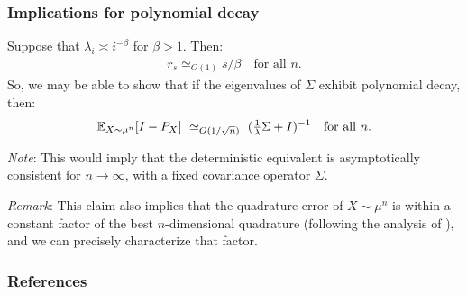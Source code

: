 \documentclass[10pt]{beamer}
\begin{document}
\begin{frame}
  \frametitle{Implications for polynomial decay}
  Suppose that $\lambda_i\asymp i^{-\beta}$ for $\beta>1$. Then:
  \begin{align*}
    r_s \simeq_{O(1)}  s/\beta\quad\text{for all $n$.}
  \end{align*}
  So, we may be able to show that if the eigenvalues of $\Sigma$
  exhibit polynomial decay, then:
  \begin{align*}
    \mathbb E_{X\sim\mu^n}[I-P_X]\ \simeq_{O(1/\sqrt{n})}\
    (\tfrac1\lambda\Sigma+ I)^{-1}\quad\text{for all $n$.}
    \end{align*}

\emph{Note}: This would imply that the deterministic equivalent is
asymptotically consistent for $n\rightarrow\infty$, with a fixed
covariance operator $\Sigma$.
\vspace{5mm}

\emph{Remark}: This claim also implies that the quadrature
error of $X\sim\mu^n$ is
within a constant factor of the best $n$-dimensional quadrature (following the analysis of
\cite{nystrom-multiple-descent}), and we can precisely characterize
that factor. 
    
\end{frame}

\begin{frame}[allowframebreaks]
  \frametitle{References}
  \tiny
  
  
\end{frame}
\end{document}
